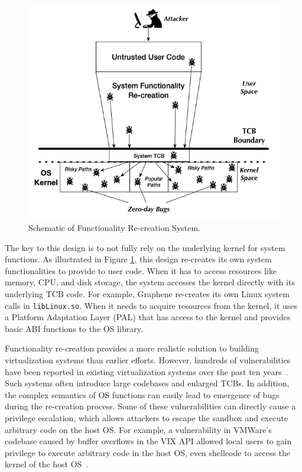 \begin{figure}%
\centering
\includegraphics[width=1.0\columnwidth]{diagram/Virtualization_Design_Model_02.png}
\caption{\small Schematic of Functionality Re-creation System. 
}
\label{fig:design_functionality_reimplementation}
\end{figure}

The key to this design is to not fully rely on the underlying
kernel for system functions. As illustrated in Figure \ref{fig:design_functionality_reimplementation},
this design re-creates its own system functionalities to provide to user code.
When it has to %
access resources like memory, CPU, and disk storage, the system accesses the kernel directly with
its underlying TCB code.
For example, Graphene \cite{Graphene-14} re-creates
its own Linux system calls in
\texttt{libLinux.so}. When it needs to acquire resources from
the kernel, it uses a
Platform Adaptation Layer (PAL)  that has access to the kernel
and provides basic ABI functions to the OS library.

Functionality re-creation provides a more realistic solution to building
virtualization systems than earlier efforts.
However, hundreds of vulnerabilities have been
reported in existing virtualization systems over the past ten years~\cite{NVD}.
Such systems often
introduce large codebases and enlarged TCBs. In addition, the
complex semantics of OS functions can easily lead to emergence of bugs during
the re-creation process. Some of these vulnerabilities
can directly cause a privilege escalation, which allows attackers to escape the sandbox
and execute arbitrary code on the host OS.
For example, a vulnerability in VMWare's codebase caused by buffer overflows in the VIX
API allowed local users to
gain privilege to execute arbitrary code in the host
OS, even shellcode to access the kernel of the host OS~\cite{CVE-2008-2100}.



